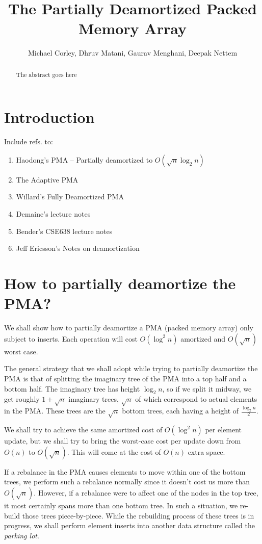 \documentclass{article}
\title{The Partially Deamortized Packed Memory Array}
\author{Michael Corley, Dhruv Matani, Gaurav Menghani, Deepak Nettem}
\begin{document}
\maketitle

\begin{abstract}
  The abstract goes here
\end{abstract}

\clearpage

\section{Introduction}
Include refs. to:
\begin{enumerate}
\item Haodong's PMA -- Partially deamortized to $O(\sqrt{n}\log_2{n})$
\item The Adaptive PMA
\item Willard's Fully Deamortized PMA
\item Demaine's lecture notes
\item Bender's CSE638 lecture notes
\item Jeff Ericsson's Notes on deamortization
\end{enumerate}

\section{How to partially deamortize the PMA?}

We shall show how to partially deamortize a PMA (packed memory array)
only subject to inserts. Each operation will cost $O(\log^2{n})$
amortized and $O(\sqrt{n})$ worst case.

The general strategy that we shall adopt while trying to partially
deamortize the PMA is that of splitting the imaginary tree of the PMA
into a top half and a bottom half. The imaginary tree has height
$\log_2{n}$, so if we split it midway, we get roughly $1 +
\sqrt{n}$ imaginary trees, $\sqrt{n}$ of which correspond to actual
elements in the PMA. These trees are the $\sqrt{n}$ bottom trees, each
having a height of $\frac{\log_2{n}}{2}$.

We shall try to achieve the same amortized cost of $O(\log^2{n})$ per
element update, but we shall try to bring the worst-case cost per
update down from $O(n)$ to $O(\sqrt{n})$. This will come at the cost
of $O(n)$ extra space.

If a rebalance in the PMA causes elements to move within one of the
bottom trees, we perform such a rebalance normally since it doesn't
cost us more than $O(\sqrt{n})$. However, if a rebalance were to
affect one of the nodes in the top tree, it most certainly spans more
than one bottom tree. In such a situation, we re-build those trees
piece-by-piece. While the rebuilding process of these trees is in
progress, we shall perform element inserts into another data structure
called the \textit{parking lot}. \\
\end{document}
